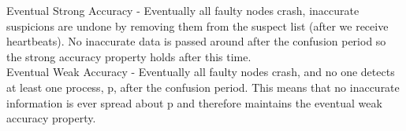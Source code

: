 \documentclass{article}
\begin{document}
\noindent
Eventual Strong Accuracy -  Eventually all faulty nodes crash, inaccurate suspicions are undone by removing them from the suspect list (after we receive heartbeats).  No inaccurate data is passed around after the confusion period so the strong accuracy property holds after this time.\\

\noindent
Eventual Weak Accuracy   - Eventually all faulty nodes crash, and no one detects at least one process, p, after the confusion period.  This means that no inaccurate information is ever spread about p and therefore maintains the eventual weak accuracy property.\\





\end{document}
